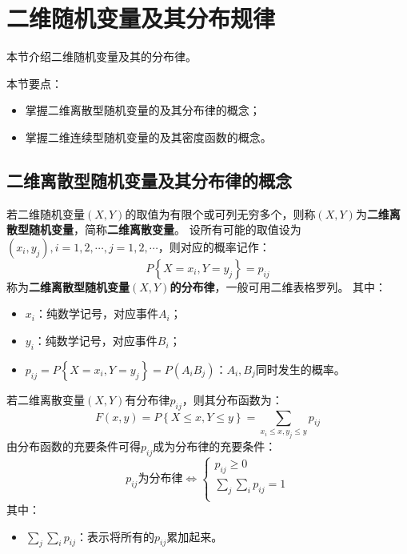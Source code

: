 \section{二维随机变量及其分布规律}

本节介绍二维随机变量及其的分布律。

本节要点：
\begin{itemize}
    \item 掌握二维离散型随机变量的及其分布律的概念；
    \item 掌握二维连续型随机变量的及其密度函数的概念。
\end{itemize}

\subsection{二维离散型随机变量及其分布律的概念}

\begin{definition}[二维离散型随机变量及其分布律]
若二维随机变量$\left( X,Y \right) $的取值为有限个或可列无穷多个，则称$\left( X,Y \right) $为{\bf 二维离散型随机变量}，简称{\bf 二维离散变量}。
设所有可能的取值设为$\left( x_i,y_j \right) ,i=1,2,\cdots ,j=1,2,\cdots $，则对应的概率记作：
\[
P\left\{ X=x_i,Y=y_j \right\} =p_{ij}
\]
称为{\bf 二维离散型随机变量$\left( X,Y \right) $的分布律}，一般可用二维表格罗列。
其中：
\begin{itemize}
    \item $x_i$：纯数学记号，对应事件$A_i$；
    \item $y_i$：纯数学记号，对应事件$B_i$；
    \item $p_{ij}=P\left\{ X=x_i,Y=y_j \right\} =P\left( A_iB_j \right) $：$A_i,B_j$同时发生的概率。
\end{itemize}
\end{definition}

若二维离散变量$\left( X,Y \right) $有分布律$p_{ij}$，则其分布函数为：
\[
F\left( x,y \right) =P\left\{ X\leqslant x,Y\leqslant y \right\} =\sum_{x_i\leqslant x,y_j\leqslant y}{p_{ij}}
\]
由分布函数的充要条件可得$p_{ij}$成为分布律的充要条件：
\[
p_{ij}\text{为分布律}\Leftrightarrow \begin{cases}
	p_{ij}\geqslant 0\\
	\sum_j{\sum_i{p_{ij}}}=1\\
\end{cases}
\]
其中：
\begin{itemize}
    \item $\sum_j{\sum_i{p_{ij}}}$：表示将所有的$p_{ij}$累加起来。
\end{itemize}

